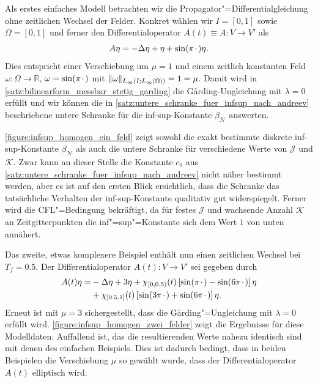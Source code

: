 \documentclass[../main.tex]{subfiles}
\begin{document}
Als erstes einfaches Modell betrachten wir die Propagator"=Differentialgleichung ohne zeitlichen Wechsel der Felder.
Konkret wählen wir $I = [0, 1]$ sowie $\Omega = [0, 1]$ und ferner den Differentialoperator $A(t) \equiv A \colon V \to V'$ als
\begin{equation}
    A \eta = - \Delta \eta + \eta + \sin(\pi {\mkern2mu\cdot\mkern2mu}) \eta.
\end{equation}
Dies entspricht einer Verschiebung um $\mu = 1$ und einem zeitlich konstanten Feld $\omega \colon \Omega \to \mathbb{R}$, $\omega = \sin(\pi {\mkern2mu\cdot\mkern2mu})$ mit $\lVert\omega\rVert_{L_{\infty}(I; L_{\infty}(\Omega))} = 1 = \mu$.
Damit wird in \cref{satz:bilinearform_messbar_stetig_garding} die G\aa{}rding-Ungleichung mit $\lambda = 0$ erfüllt und wir können die in \cref{satz:untere_schranke_fuer_infsup_nach_andreev} beschriebene untere Schranke für die inf-sup-Konstante $\beta_{\mathcal N}$ auswerten.

\cref{figure:infsup_homogen_ein_feld} zeigt sowohl die exakt bestimmte diskrete inf-sup-Konstante $\beta_{\mathcal N}$ als auch die untere Schranke für verschiedene Werte von $\mathcal J$ und $\mathcal K$.
Zwar kann an dieser Stelle die Konstante $c_{0}$ aus \cref{satz:untere_schranke_fuer_infsup_nach_andreev} nicht näher bestimmt werden, aber es ist auf den ersten Blick ersichtlich, dass die Schranke das tatsächliche Verhalten der inf-sup-Konstante qualitativ gut widerspiegelt.
Ferner wird die CFL"=Bedingung bekräftigt, da für festes $\mathcal J$ und wachsende Anzahl $\mathcal K$ an Zeitgitterpunkten die inf"=sup"=Konstante sich dem Wert $1$ von unten annähert.

Das zweite, etwas komplexere Beispiel enthält nun einen zeitlichen Wechsel bei $T_{f} = 0.5$.
Der Differentialoperator $A(t) \colon V \to V'$ sei gegeben durch
\begin{equation}
    \begin{aligned}
        A(t)\eta =
        &- \Delta \eta + 3 \eta + \chi_{[0, 0.5)}(t) \left[ \sin(\pi {\mkern2mu\cdot\mkern2mu}) - \sin(6 \pi {\mkern2mu\cdot\mkern2mu}) \right] \eta
        \\&+ \chi_{[0.5, 1]}(t) \left[ \sin(3 \pi {\mkern2mu\cdot\mkern2mu} ) + \sin(6 \pi {\mkern2mu\cdot\mkern2mu}) \right] \eta.
    \end{aligned}
\end{equation}
Erneut ist mit $\mu = 3$ sichergestellt, dass die G\aa{}rding"=Ungleichung mit $\lambda = 0$ erfüllt wird.
\cref{figure:infsup_homogen_zwei_felder} zeigt die Ergebnisse für diese Modelldaten.
Auffallend ist, das die resultierenden Werte nahezu identisch sind mit denen des einfachen Beispiels.
Dies ist dadurch bedingt, dass in beiden Beispielen die Verschiebung $\mu$ so gewählt wurde, dass der Differentialoperator $A(t)$ elliptisch wird.
\end{document}
